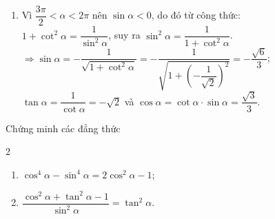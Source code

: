 \begin{bt}
{\begin{enumerate}
		$1+\tan^2\alpha=\dfrac{1}{\cos^2\alpha}$, suy ra $\cos^2\alpha=\dfrac{1}{1+\tan^2\alpha}$.\\
		$\Rightarrow\cos\alpha=-\dfrac{1}{\sqrt{1+\tan^2\alpha}}=-\dfrac{1}{\sqrt{1+(\sqrt{5})^2}}=-\dfrac{\sqrt{6}}{6}$;\\ $\cot\alpha=\dfrac{1}{\tan\alpha}=\dfrac{\sqrt{5}}{5}$ và $\sin\alpha=\tan\alpha\cdot\cos\alpha=-\dfrac{\sqrt{30}}{6}$.
		\item 
		Vì $\dfrac{3\pi}{2}<\alpha<2\pi$ nên $\sin\alpha<0$, do đó từ công thức:\\
		$1+\cot^2\alpha=\dfrac{1}{\sin^2\alpha}$, suy ra $\sin^2\alpha=\dfrac{1}{1+\cot^2\alpha}$.\\
		$\Rightarrow\sin\alpha=-\dfrac{1}{\sqrt{1+\cot^2\alpha}}=-\dfrac{1}{\sqrt{1+\left(-\dfrac{1}{\sqrt{2}}\right)^2}}=-\dfrac{\sqrt{6}}{3}$;\\ $\tan\alpha=\dfrac{1}{\cot\alpha}=-\sqrt{2}$ và $\cos\alpha=\cot\alpha\cdot\sin\alpha=\dfrac{\sqrt{3}}{3}$.
		\end{enumerate}
	}
\end{bt}

\begin{bt}%
	Chứng minh các đẳng thức
	\begin{multicols}{2}
		\begin{enumerate}
			\item $\cos^4\alpha-\sin^4\alpha=2\cos^2\alpha-1$;
			\item $\dfrac{\cos^2\alpha+\tan^2\alpha-1}{\sin^2\alpha}=\tan^2\alpha$.
		\end{enumerate}
	\end{multicols}
\end{bt}

